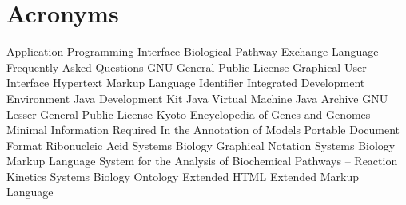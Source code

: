 \chapter{Acronyms}
\begin{acronym}
        {Application Programming Interface}
     {Biological Pathway Exchange Language}
        {Frequently Asked Questions}
        {GNU General Public License}
        {Graphical User Interface}
       {Hypertext Markup Language}
         {Identifier}
        {Integrated Development Environment}
        {Java\texttrademark{} Development Kit}
        {Java\texttrademark{} Virtual Machine}
        {Java\texttrademark{} Archive}
       {GNU Lesser General Public License}
       {Kyoto Encyclopedia of Genes and Genomes}
     {Minimal Information Required In the Annotation of Models}
        {Portable Document Format}
        {Ribonucleic Acid}
       {Systems Biology Graphical Notation}
       {Systems Biology Markup Language}
   {System for the Analysis of Biochemical Pathways -- Reaction Kinetics}
        {Systems Biology Ontology}
      {Extended \acs{HTML}}
        {Extended Markup Language}
\end{acronym}
